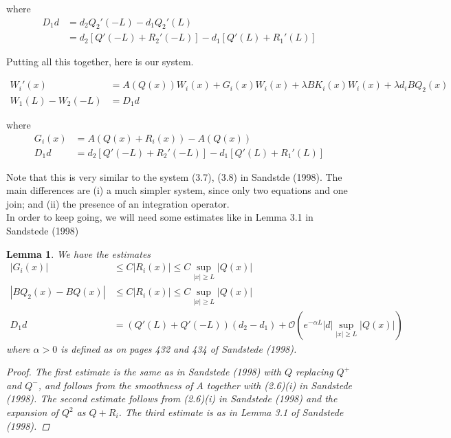 \documentclass[12pt]{article}
\newtheorem{lemma}{Lemma}
\begin{document}
where
\begin{align*}
D_1 d &= d_2 Q_2'(-L) - d_1 Q_2'(L)\\
&= d_2 [ Q'(-L) + R_2'(-L)] - d_1 [ Q'(L) + R_1'(L) ]
\end{align*}

Putting all this together, here is our system.

\begin{align}\label{system}
W_i'(x) &= A(Q(x)) W_i(x) + G_i(x) W_i(x) + \lambda B K_i(x) W_i(x) + \lambda d_i B Q_2(x)  \\
W_1(L) - W_2(-L) &= D_1 d
\end{align}

where
\begin{align}
G_i(x) &= A(Q(x) + R_i(x)) - A(Q(x)) \\
D_1 d &= d_2 [ Q'(-L) + R_2'(-L)] - d_1 [ Q'(L) + R_1'(L) ]
\end{align}

Note that this is very similar to the system (3.7), (3.8) in Sandstde (1998). The main differences are (i) a much simpler system, since only two equations and one join; and (ii) the presence of an integration operator.\\

In order to keep going, we will need some estimates like in Lemma 3.1 in Sandstede (1998)

\begin{lemma}We have the estimates
\begin{align*}
|G_i(x)| &\leq C|R_i(x)| \leq C \sup_{|x| \geq L} |Q(x)| \\
| B Q_2(x) - B Q(x) | & \leq C |R_i(x)| \leq C \sup_{|x| \geq L} |Q(x)| \\
D_1 d &= (Q'(L) + Q'(-L))(d_2 - d_1) +\mathcal{O}\left( e^{-\alpha L} |d| \sup_{|x| \geq L} |Q(x)| \right)
\end{align*}
where $\alpha > 0$ is defined as on pages 432 and 434 of Sandstede (1998).
\begin{proof}
The first estimate is the same as in Sandstede (1998) with $Q$ replacing $Q^+$ and $Q^-$, and follows from the smoothness of $A$ together with (2.6)(i) in Sandstede (1998). The second estimate follows from (2.6)(i) in Sandstede (1998) and the expansion of $Q^2$ as $Q + R_i$. The third estimate is as in Lemma 3.1 of Sandstede (1998).
\end{proof}
\end{lemma}
\end{document}
